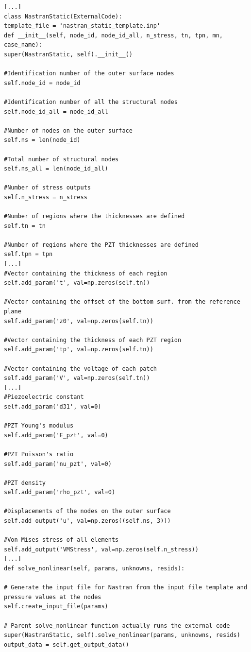 \documentclass[twocolumn,a4paper,10pt,english]{article}
\begin{document}
\begin{verbatim}
[...]
class NastranStatic(ExternalCode):
template_file = 'nastran_static_template.inp'
def __init__(self, node_id, node_id_all, n_stress, tn, tpn, mn, case_name):
super(NastranStatic, self).__init__()

#Identification number of the outer surface nodes
self.node_id = node_id

#Identification number of all the structural nodes
self.node_id_all = node_id_all

#Number of nodes on the outer surface
self.ns = len(node_id)

#Total number of structural nodes
self.ns_all = len(node_id_all)

#Number of stress outputs
self.n_stress = n_stress

#Number of regions where the thicknesses are defined
self.tn = tn

#Number of regions where the PZT thicknesses are defined
self.tpn = tpn
[...]
#Vector containing the thickness of each region
self.add_param('t', val=np.zeros(self.tn))

#Vector containing the offset of the bottom surf. from the reference plane
self.add_param('z0', val=np.zeros(self.tn))

#Vector containing the thickness of each PZT region
self.add_param('tp', val=np.zeros(self.tn))

#Vector containing the voltage of each patch
self.add_param('V', val=np.zeros(self.tn))
[...]
#Piezoelectric constant
self.add_param('d31', val=0)

#PZT Young's modulus
self.add_param('E_pzt', val=0)

#PZT Poisson's ratio
self.add_param('nu_pzt', val=0)

#PZT density
self.add_param('rho_pzt', val=0)

#Displacements of the nodes on the outer surface
self.add_output('u', val=np.zeros((self.ns, 3)))

#Von Mises stress of all elements
self.add_output('VMStress', val=np.zeros(self.n_stress))
[...]
def solve_nonlinear(self, params, unknowns, resids):

# Generate the input file for Nastran from the input file template and pressure values at the nodes
self.create_input_file(params)

# Parent solve_nonlinear function actually runs the external code
super(NastranStatic, self).solve_nonlinear(params, unknowns, resids)
output_data = self.get_output_data()


\end{verbatim}
\end{document}
